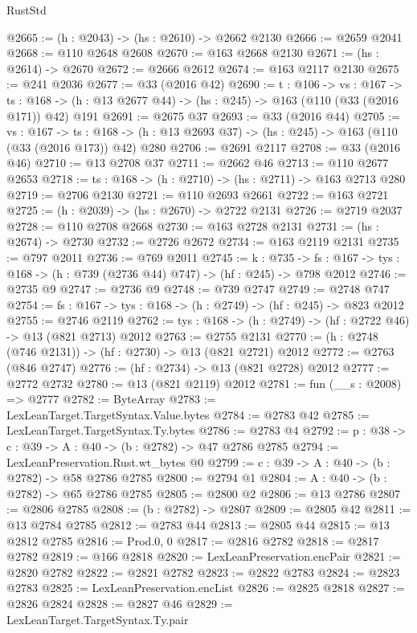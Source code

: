 \begin{lexlean}{RustStd}
\begin{coremodule}
@2665 := (h : @2043) -> (hs : @2610) -> @2662 @2130
@2666 := @2659 @2041
@2668 := @110 @2648 @2608
@2670 := @163 @2668 @2130
@2671 := (hs : @2614) -> @2670
@2672 := @2666 @2612
@2674 := @163 @2117 @2130
@2675 := @241 @2036
@2677 := @33 (@2016 @42)
@2690 := {t : @106} ->
  {vs : @167} ->
  {ts : @168} -> (h : @13 @2677 @44) -> (hs : @245) -> @163 (@110 (@33 (@2016 @171)) @42) @191
@2691 := @2675 @37
@2693 := @33 (@2016 @44)
@2705 := {vs : @167} ->
  {ts : @168} -> (h : @13 @2693 @37) -> (hs : @245) -> @163 (@110 (@33 (@2016 @173)) @42) @280
@2706 := @2691 @2117
@2708 := @33 (@2016 @46)
@2710 := @13 @2708 @37
@2711 := @2662 @46
@2713 := @110 @2677 @2653
@2718 := {ts : @168} -> (h : @2710) -> (hs : @2711) -> @163 @2713 @280
@2719 := @2706 @2130
@2721 := @110 @2693 @2661
@2722 := @163 @2721
@2725 := (h : @2039) -> (hs : @2670) -> @2722 @2131
@2726 := @2719 @2037
@2728 := @110 @2708 @2668
@2730 := @163 @2728 @2131
@2731 := (hs : @2674) -> @2730
@2732 := @2726 @2672
@2734 := @163 @2119 @2131
@2735 := @797 @2011
@2736 := @769 @2011
@2745 := {k : @735} ->
  {fs : @167} -> {tys : @168} -> (h : @739 (@2736 @44) @747) -> (hf : @245) -> @798 @2012
@2746 := @2735 @9
@2747 := @2736 @9
@2748 := @739 @2747
@2749 := @2748 @747
@2754 := {fs : @167} -> {tys : @168} -> (h : @2749) -> (hf : @245) -> @823 @2012
@2755 := @2746 @2119
@2762 := {tys : @168} -> (h : @2749) -> (hf : @2722 @46) -> @13 (@821 @2713) @2012
@2763 := @2755 @2131
@2770 := (h : @2748 (@746 @2131)) -> (hf : @2730) -> @13 (@821 @2721) @2012
@2772 := @2763 (@846 @2747)
@2776 := (hf : @2734) -> @13 (@821 @2728) @2012
@2777 := @2772 @2732
@2780 := @13 (@821 @2119) @2012
@2781 := fun (__s : @2008) => @2777
@2782 := ByteArray
@2783 := LexLeanTarget.TargetSyntax.Value.bytes
@2784 := @2783 @42
@2785 := LexLeanTarget.TargetSyntax.Ty.bytes
@2786 := @2783 @4
@2792 := {p : @38} -> {c : @39} -> {A : @40} -> (b : @2782) -> @47 @2786 @2785
@2794 := LexLeanPreservation.Rust.wt_bytes @0
@2799 := {c : @39} -> {A : @40} -> (b : @2782) -> @58 @2786 @2785
@2800 := @2794 @1
@2804 := {A : @40} -> (b : @2782) -> @65 @2786 @2785
@2805 := @2800 @2
@2806 := @13 @2786
@2807 := @2806 @2785
@2808 := (b : @2782) -> @2807
@2809 := @2805 @42
@2811 := @13 @2784 @2785
@2812 := @2783 @44
@2813 := @2805 @44
@2815 := @13 @2812 @2785
@2816 := Prod.{0, 0}
@2817 := @2816 @2782
@2818 := @2817 @2782
@2819 := @166 @2818
@2820 := LexLeanPreservation.encPair
@2821 := @2820 @2782
@2822 := @2821 @2782
@2823 := @2822 @2783
@2824 := @2823 @2783
@2825 := LexLeanPreservation.encList
@2826 := @2825 @2818
@2827 := @2826 @2824
@2828 := @2827 @46
@2829 := LexLeanTarget.TargetSyntax.Ty.pair

\end{coremodule}
\end{lexlean}
